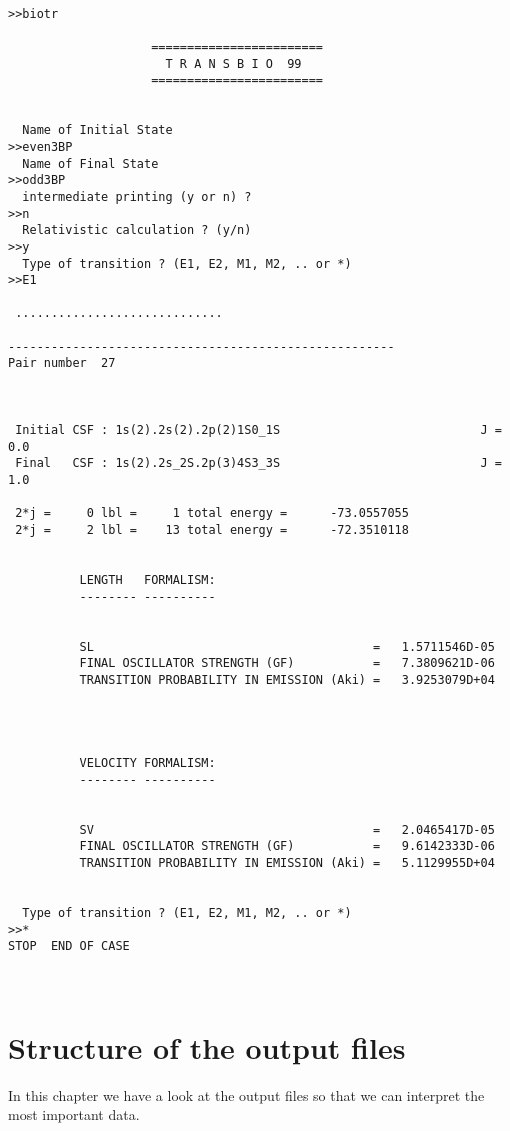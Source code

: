 \documentclass[fleqn,10pt]{book}
\begin{document}
\begin{verbatim}
 
>>biotr

                    ========================
                      T R A N S B I O  99 
                    ========================


  Name of Initial State
>>even3BP
  Name of Final State
>>odd3BP
  intermediate printing (y or n) ?  
>>n
  Relativistic calculation ? (y/n) 
>>y
  Type of transition ? (E1, E2, M1, M2, .. or *) 
>>E1
 
 .............................
 
------------------------------------------------------
Pair number  27



 Initial CSF : 1s(2).2s(2).2p(2)1S0_1S                            J = 0.0
 Final   CSF : 1s(2).2s_2S.2p(3)4S3_3S                            J = 1.0

 2*j =     0 lbl =     1 total energy =      -73.0557055
 2*j =     2 lbl =    13 total energy =      -72.3510118


          LENGTH   FORMALISM: 
          -------- ----------


          SL                                       =   1.5711546D-05
          FINAL OSCILLATOR STRENGTH (GF)           =   7.3809621D-06
          TRANSITION PROBABILITY IN EMISSION (Aki) =   3.9253079D+04




          VELOCITY FORMALISM: 
          -------- ----------


          SV                                       =   2.0465417D-05
          FINAL OSCILLATOR STRENGTH (GF)           =   9.6142333D-06
          TRANSITION PROBABILITY IN EMISSION (Aki) =   5.1129955D+04


  Type of transition ? (E1, E2, M1, M2, .. or *) 
>>*
STOP  END OF CASE

 

\end{verbatim}                            
\chapter{Structure of the output files}
In this chapter we have a look at the output files so that we can interpret the most important data.
\end{document}
